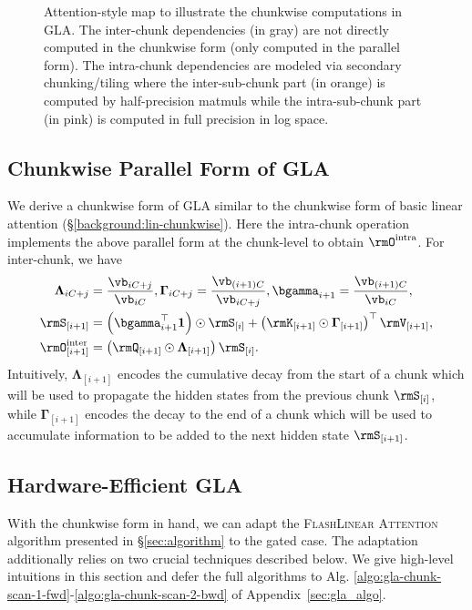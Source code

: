 \begin{figure}[t]
\begin{tikzpicture}[x=0.2cm, y=0.2cm]
    \end{tikzpicture}
\vspace{-2mm}
    \caption{
    Attention-style map to illustrate the chunkwise computations in GLA. The inter-chunk dependencies (in gray) 
    are not directly computed in the chunkwise form (only computed in the parallel form).
    The intra-chunk dependencies are modeled via secondary chunking/tiling where the inter-sub-chunk part (in orange) is computed by half-precision matmuls while the intra-sub-chunk part (in pink) is computed in full precision in log space. 
    }
    \label{fig:gla_tiling}

\end{figure}

\vspace{-2mm}
\subsection{Chunkwise Parallel Form of GLA}
\vspace{-2mm}
We derive a chunkwise form of GLA similar to the chunkwise form of basic linear attention (\S\ref{background:lin-chunkwise}). Here the intra-chunk operation implements the above parallel form at the chunk-level to obtain $\rmO^{\text{intra}}$. For inter-chunk, we have
\begin{align*}
\mathbf{\Lambda}_{iC+j} &= \frac{\vb_{iC+j}}{\vb_{iC}},  \mathbf{\Gamma}_{iC+j} = \frac{\vb_{(i+1)C}}{\vb_{iC+j}}, 
\bgamma_{i+1} = \frac{\vb_{(i+1)C}}{\vb_{iC}},  
 \\
\rmS_{[i+1]} &= \left(\bgamma_{i+1}^{\top}\mathbf{1}\right)  \odot \rmS_{[i]} + \left(\rmK_{[i+1]} \odot \mathbf \Gamma_{[i+1]} \right)^{\top}
\rmV_{[i+1]},  \\
\rmO^{\text{inter}}_{[i+1]} &= \left(\rmQ_{[i+1]} \odot \mathbf \Lambda_{[i+1]}\right) \rmS_{[i]}. 
\end{align*}
Intuitively, $\mathbf \Lambda_{[i+1]} $ encodes the cumulative decay from the start of a chunk which will be used to propagate the hidden states from the previous chunk $\rmS_{[i]}$, while   $\mathbf \Gamma_{[i+1]}$ encodes the decay to the end of a chunk which will be used to accumulate information to be added to the next hidden state $\rmS_{[i+1]}$.
\vspace{-2mm}
\subsection{Hardware-Efficient GLA}
\vspace{-2mm}
\label{subsec:flash-gla}
With the chunkwise form in hand, we can adapt the \textsc{FlashLinear Attention} algorithm presented in \S\ref{sec:algorithm} to the gated case. The adaptation additionally relies on two crucial techniques described below. 
We give high-level intuitions in this section
and defer the full algorithms to Alg. \ref{algo:gla-chunk-scan-1-fwd}-\ref{algo:gla-chunk-scan-2-bwd} of Appendix~\ref{sec:gla_algo}.

